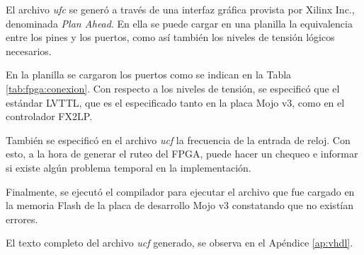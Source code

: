 	El archivo \textit{ufc} se generó a través de una interfaz gráfica provista por Xilinx Inc., denominada \textit{Plan Ahead}. En ella se puede cargar en una planilla la equivalencia entre los pines y los puertos, como así también los niveles de tensión lógicos necesarios.
	
	En la planilla se cargaron los puertos como se indican en la Tabla \ref{tab:fpga:conexion}. Con respecto a los niveles de tensión, se especificó que el estándar LVTTL, que es el especificado tanto en la placa Mojo v3\cite{Mojo}, como en el controlador FX2LP\cite{Cypress2017}. 
	
	También se especificó en el archivo \textit{ucf} la frecuencia de la entrada de reloj. Con esto, a la hora de generar el ruteo del FPGA, puede hacer un chequeo e informar si existe algún problema temporal en la implementación.
	
	Finalmente, se ejecutó el compilador para ejecutar el archivo que fue cargado en la memoria Flash de la placa de desarrollo Mojo v3 constatando que no existían errores.
	
	El texto completo del archivo \textit{ucf} generado, se observa en el Apéndice \ref{ap:vhdl}.